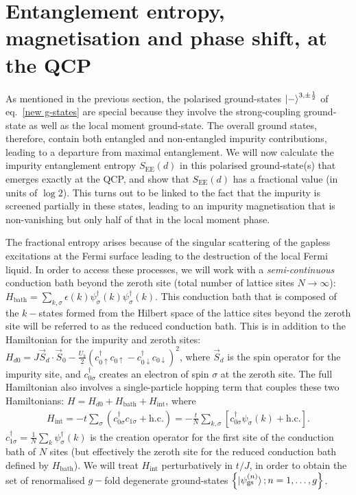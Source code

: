 \documentclass{iopart}
\begin{document}
\section{Entanglement entropy, magnetisation and phase shift, at the QCP}
As mentioned in the previous section, the polarised ground-states \(\ket{-}^{3,\pm\frac{1}{2}}\) of eq.~\eqref{new g-states} are special because they involve the strong-coupling ground-state as well as the local moment ground-state. The overall ground states, therefore, contain both entangled and non-entangled impurity contributions, leading to a departure from maximal entanglement. We will now calculate the impurity entanglement entropy \(S_\text{EE}(d)\) in this polarised ground-state(s) that emerges exactly at the QCP, and show that \(S_\text{EE}(d)\) has a fractional value (in units of \(\log 2\)). This turns out to be linked to the fact that the impurity is screened partially in these states, leading to an impurity magnetisation that is non-vanishing but only half of that in the local moment phase.

The fractional entropy arises because of the singular scattering of the gapless excitations at the Fermi surface leading to the destruction of the local Fermi liquid. In order to access these processes, we will work with a {\it semi-continuous} conduction bath beyond the zeroth site (total number of lattice sites \(N \to \infty\)): \(H_\text{bath} = \sum_{k,\sigma} \epsilon(k) \psi^\dagger_\sigma(k)\psi^\dagger_\sigma(k)\). This conduction bath that is composed of the \(k-\)states formed from the Hilbert space of the lattice sites beyond the zeroth site will be referred to as the reduced conduction bath. This is in addition to the Hamiltonian for the impurity and zeroth sites: \(H_{d0} = J \vec{S}_d\cdot\vec{S}_0 - \frac{U_b}{2}\left(c_{0\uparrow}^\dagger c_{0\uparrow} - c_{0\downarrow}^\dagger c_{0\downarrow}\right)^2\), where \(\vec S_d\) is the spin operator for the impurity site, and \(c_{0\sigma}^\dagger\) creates an electron of spin \(\sigma\) at the zeroth site. The full Hamiltonian also involves a single-particle hopping term that couples these two Hamiltonians: \(H = H_{d0} + H_\text{bath} + H_\text{int}\), where
\begin{eqnarray}
	H_\text{int} = -t \sum_\sigma\left( c^\dagger_{0 \sigma} c_{1\sigma} + \text{h.c.} \right) = -\frac{t}{N}\sum_{k,\sigma} \left[c^\dagger_{0\sigma} \psi_\sigma(k) + \text{h.c.}\right].
\end{eqnarray}
\(c^\dagger_{1\sigma} = \frac{1}{N}\sum_k \psi^\dagger_\sigma(k)\) is the creation operator for the first site of the conduction bath of \(N\) sites (but effectively the zeroth site for the reduced conduction bath defined by \(H_\text{bath}\)). We will treat \(H_\text{int}\) perturbatively in \(t/J\), in order to obtain the set of renormalised \(g-\)fold degenerate ground-states \(\left\{ \ket{\psi^{(n)}_\text{gs}}; n=1,\ldots,g\right\}\).
\end{document}

